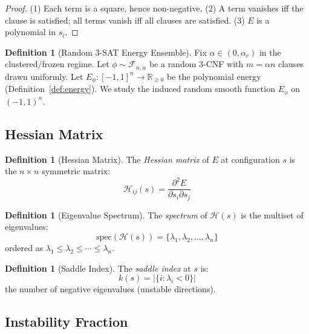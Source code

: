 \documentclass[11pt,a4paper]{article}
\theoremstyle{plain}
\theoremstyle{definition}
\newtheorem{definition}[theorem]{Definition}
\theoremstyle{remark}
\newcommand{\Hess}{\mathcal{H}}
\begin{document}
\begin{proof}
(1) Each term is a square, hence non-negative. (2) A term vanishes iff the clause is satisfied; all terms vanish iff all clauses are satisfied. (3) $E$ is a polynomial in $s_i$.
\end{proof}

\begin{definition}[Random 3-SAT Energy Ensemble]
\label{def:ensemble}
Fix $\alpha \in (0,\alpha_c)$ in the clustered/frozen regime. Let $\phi \sim \mathcal{F}_{n,\alpha}$ be a random 3-CNF with $m=\alpha n$ clauses drawn uniformly.
Let $E_\phi:[-1,1]^n\to\mathbb{R}_{\ge 0}$ be the polynomial energy (Definition~\ref{def:energy}).
We study the induced random smooth function $E_\phi$ on $(-1,1)^n$.
\end{definition}

\subsection{Hessian Matrix}

\begin{definition}[Hessian Matrix]\label{def:hessian}
The \emph{Hessian matrix} of $E$ at configuration $s$ is the $n \times n$ symmetric matrix:
\begin{equation}
    \Hess_{ij}(s) = \frac{\partial^2 E}{\partial s_i \partial s_j}
\end{equation}
\end{definition}

\begin{definition}[Eigenvalue Spectrum]
The \emph{spectrum} of $\Hess(s)$ is the multiset of eigenvalues:
\begin{equation}
    \text{spec}(\Hess(s)) = \{\lambda_1, \lambda_2, \ldots, \lambda_n\}
\end{equation}
ordered as $\lambda_1 \leq \lambda_2 \leq \cdots \leq \lambda_n$.
\end{definition}

\begin{definition}[Saddle Index]
The \emph{saddle index} at $s$ is:
\begin{equation}
    k(s) = |\{i : \lambda_i < 0\}|
\end{equation}
the number of negative eigenvalues (unstable directions).
\end{definition}

\subsection{Instability Fraction}
\end{document}

